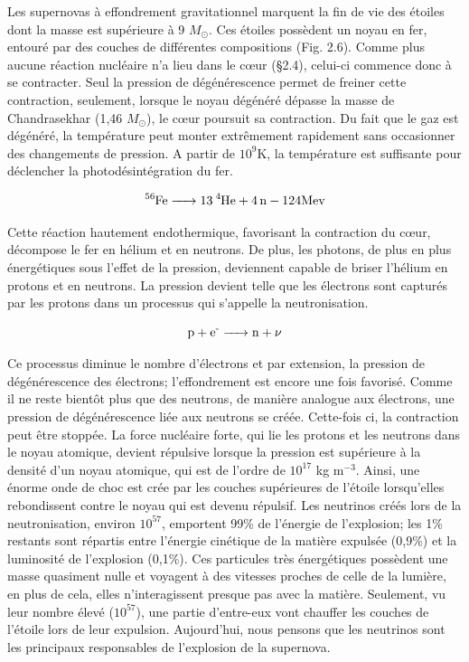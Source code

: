 Les supernovas à effondrement gravitationnel marquent la fin de vie des étoiles dont la masse est supérieure à 9 $M_\odot$. Ces étoiles possèdent un noyau en fer, entouré par des couches de différentes compositions (Fig. 2.6). Comme plus aucune réaction nucléaire n'a lieu dans le cœur (§2.4), celui-ci commence donc à se contracter. Seul la pression de dégénérescence permet de freiner cette contraction, seulement, lorsque le noyau dégénéré dépasse la masse de Chandrasekhar (1,46 $M_\odot$), le cœur poursuit sa contraction. Du fait que le gaz est dégénéré, la température peut monter extrêmement rapidement sans occasionner des changements de pression. A partir de $10^{9}$K, la température est suffisante pour déclencher la photodésintégration du fer.\bigskip  %

\begin{equation} \ce{\ce{^{56}Fe} -> \ce{13\ce{^{4}He}} + \ce{4n} - {124Mev}}\end{equation}\bigskip

Cette réaction hautement endothermique, favorisant la contraction du cœur, décompose le fer en hélium et en neutrons. De plus, les photons, de plus en plus énergétiques sous l'effet de la pression, deviennent capable de briser l'hélium en protons et en neutrons. La pression devient telle que les électrons sont capturés par les protons dans un processus qui s'appelle la neutronisation.\bigskip

\begin{equation} \ce{p + e{^-} -> n + $\nu$}\end{equation}\bigskip

Ce processus diminue le nombre d'électrons et par extension, la pression de dégénérescence des électrons; l'effondrement est encore une fois favorisé. Comme il ne reste bientôt plus que des neutrons, de manière analogue aux électrons, une pression de dégénérescence liée aux neutrons se créée. Cette-fois ci, la contraction  peut être stoppée. La force nucléaire forte, qui lie les protons et les neutrons dans le noyau atomique, devient répulsive lorsque la pression est supérieure à la densité d'un noyau atomique, qui est de l'ordre de $10^{17}$ kg  m$^{-3}$. Ainsi, une énorme onde de choc est crée par les couches supérieures de l'étoile lorsqu'elles rebondissent contre le noyau qui est devenu répulsif.
Les neutrinos créés lors de la neutronisation, environ $10^{57}$, emportent 99\% de l'énergie de l'explosion; les 1\% restants sont répartis entre l'énergie cinétique de la matière expulsée (0,9\%) et la luminosité de l'explosion (0,1\%). Ces particules très énergétiques possèdent une masse quasiment nulle et voyagent à des vitesses proches de celle de la lumière, en plus de cela, elles n'interagissent presque pas avec la matière. Seulement, vu leur nombre élevé ($10^{57}$), une partie d'entre-eux vont chauffer les couches de l'étoile lors de leur expulsion. Aujourd'hui, nous pensons que les neutrinos sont les principaux responsables de l'explosion de la supernova.\smallskip

